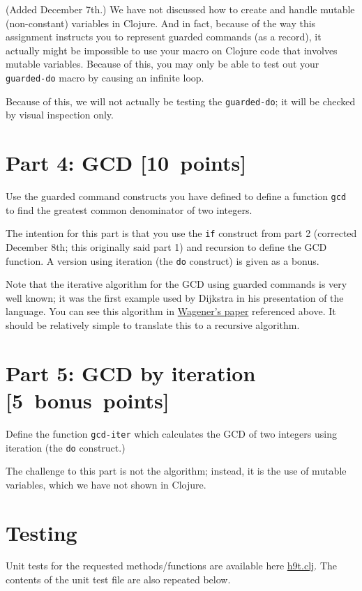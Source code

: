 \documentclass[11pt]{article}
\begin{document}
(Added December 7th.) We have not discussed how to create and
handle mutable (non-constant) variables in Clojure.
And in fact, because of the way this assignment instructs
you to represent guarded commands (as a record),
it actually might be impossible to use your macro on Clojure code
that involves mutable variables.
Because of this, you may only be able to test out your \texttt{guarded-do} macro
by causing an infinite loop.

Because of this, we will not actually be testing the \texttt{guarded-do};
it will be checked by visual inspection only.

\section*{Part 4: GCD                                                   [10 points]}
\label{sec:org32b3680}
Use the guarded command constructs you have defined
to define a function \texttt{gcd} to find the greatest common denominator
of two integers.

The intention for this part is that you use the \texttt{if} construct
from part 2 (corrected December 8th; this originally said part 1)
and recursion to define the GCD function.
A version using iteration (the \texttt{do} construct) is given as a bonus.

Note that the iterative algorithm for the GCD using guarded commands is
very well known; it was the first example used by Dijkstra
in his presentation of the language.
You can see this algorithm in
\href{https://dl.acm.org/doi/10.5555/1074100.1074433}{Wagener's paper} referenced above.
It should be relatively simple to translate this to a recursive algorithm.

\section*{Part 5: GCD by iteration [5 bonus points]}
\label{sec:orgb47799f}
Define the function \texttt{gcd-iter} which calculates the GCD of two integers
using iteration (the \texttt{do} construct.)

The challenge to this part is not the algorithm;
instead, it is the use of mutable variables,
which we have not shown in Clojure.

\section*{Testing}
\label{sec:org6df55d6}
Unit tests for the requested methods/functions
are available here \href{./testing/h9/h9t.clj}{h9t.clj}.
The contents of the unit test file are also repeated below.
\end{document}
